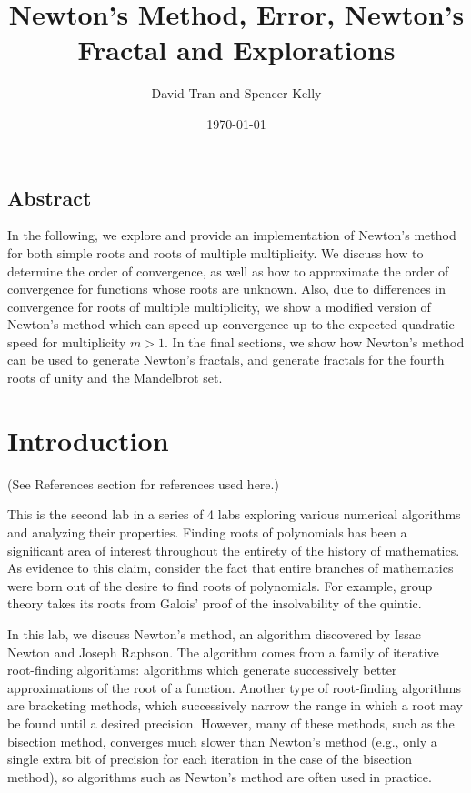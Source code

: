 \documentclass[11pt]{article}
\title{Newton's Method, Error, Newton's Fractal and Explorations}
\author{David Tran and Spencer Kelly}
\date{\today}
\begin{document}
\maketitle

\subsection*{Abstract}

In the following, we explore and provide an implementation of Newton's method for both simple roots and roots of multiple multiplicity. We discuss how to determine the order of convergence, as well as how to approximate the order of convergence for functions whose roots are unknown. Also, due to differences in convergence for roots of multiple multiplicity, we show a modified version of Newton's method which can speed up convergence up to the expected quadratic speed for multiplicity $m > 1$. In the final sections, we show how Newton's method can be used to generate Newton's fractals, and generate fractals for the fourth roots of unity and the Mandelbrot set.

\section{Introduction}

(See References section for references used here.)

This is the second lab in a series of 4 labs exploring various numerical algorithms and analyzing their properties. Finding roots of polynomials has been a significant area of interest throughout the entirety of the history of mathematics. As evidence to this claim, consider the fact that entire branches of mathematics were born out of the desire to find roots of polynomials. For example, group theory takes its roots from Galois' proof of the insolvability of the quintic.

In this lab, we discuss Newton's method, an algorithm discovered by Issac Newton and Joseph Raphson. The algorithm comes from a family of iterative root-finding algorithms: algorithms which generate successively better approximations of the root of a function. Another type of root-finding algorithms are bracketing methods, which successively narrow the range in which a root may be found until a desired precision. However, many of these methods, such as the bisection method, converges much slower than Newton's method (e.g., only a single extra bit of precision for each iteration in the case of the bisection method), so algorithms such as Newton's method are often used in practice.
\end{document}
